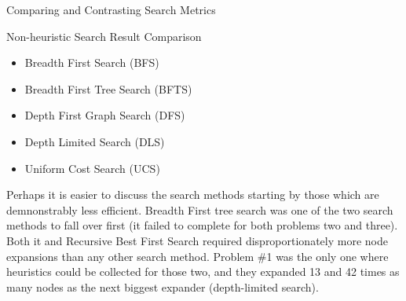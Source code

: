 \documentclass{article}
\begin{document}
\begin{section}{Comparing and Contrasting Search Metrics}
\begin{subsection}{Non-heuristic Search Result Comparison}
\begin{itemize}
		\item Breadth First Search (BFS)
		\item Breadth First Tree Search (BFTS) 
		\item Depth First Graph Search (DFS)
		\item Depth Limited Search (DLS)
		\item Uniform Cost Search (UCS)
	\end{itemize}
	Perhaps it is easier to discuss the search methods starting by those which are demnonstrably less efficient. Breadth First 
	tree search was one of the two search methods to fall over first (it failed to complete for both problems two and three). 
	Both it and Recursive Best First Search required disproportionately more node expansions than any other search method. Problem \#1 
	was the only one where heuristics could be collected for those two, and they expanded 13 and 42 times as many nodes as the next
	biggest expander (depth-limited search).\par
	

\end{subsection}
\end{section}
\end{document}
